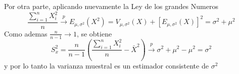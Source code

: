 \documentclass[a4paper]{article}
\begin{document}
Por otra parte, aplicando nuevamente la Ley de los grandes Numeros
\begin{equation*}
    \frac{\sum_{i=1}^n X_{i}^2}{n} \xrightarrow[]{p} E_{\mu, \sigma^2}(X^2) = V_{\mu, \sigma^2}(X) + [E_{\mu, \sigma^2}(X)]^2 = \sigma^2 + \mu^2
\end{equation*}
Como ademas $\frac{n}{n-1} \rightarrow 1$, se obtiene
\begin{equation*}
    S_{x}^2 = \frac{n}{n-1}(\frac{\sum_{i=1}^n X_{i}^2}{n} - \bar{X}^2) \xrightarrow[]{p} \sigma^2 + \mu^2 -\mu^2 = \sigma^2
\end{equation*}
y por lo tanto la varianza muestral es un estimador consistente de $\sigma^2$
\end{document}
